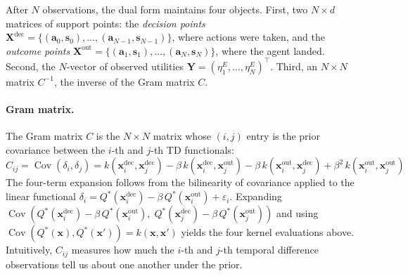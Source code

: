 After $N$ observations, the dual form maintains four objects. First, two
$N \times d$ matrices of support points: the \emph{decision points}
$\mathbf{X}^{\mathrm{dec}} = \{(\mathbf{a}_0, \mathbf{s}_0), \ldots,
(\mathbf{a}_{N-1}, \mathbf{s}_{N-1})\}$, where actions were taken, and
the \emph{outcome points}
$\mathbf{X}^{\mathrm{out}} = \{(\mathbf{a}_1, \mathbf{s}_1), \ldots,
(\mathbf{a}_N, \mathbf{s}_N)\}$, where the agent landed. Second, the
$N$-vector of observed utilities
$\mathbf{Y} = (\eta^E_1, \ldots, \eta^E_N)^\top$. Third, an $N \times N$
matrix $C^{-1}$, the inverse of the Gram matrix $C$.

\paragraph{Gram matrix.}
The Gram matrix $C$ is the $N \times N$ matrix whose $(i,j)$ entry is the
prior covariance between the $i$-th and $j$-th TD functionals:
\begin{equation}
    C_{ij} = \operatorname{Cov}(\delta_i, \delta_j)
    = k(\mathbf{x}^{\mathrm{dec}}_i, \mathbf{x}^{\mathrm{dec}}_j)
    - \beta\, k(\mathbf{x}^{\mathrm{dec}}_i, \mathbf{x}^{\mathrm{out}}_j)
    - \beta\, k(\mathbf{x}^{\mathrm{out}}_i, \mathbf{x}^{\mathrm{dec}}_j)
    + \beta^2\, k(\mathbf{x}^{\mathrm{out}}_i, \mathbf{x}^{\mathrm{out}}_j)
\end{equation}
The four-term expansion follows from the bilinearity of covariance applied to
the linear functional $\delta_i = Q^*(\mathbf{x}^{\mathrm{dec}}_i) -
\beta\, Q^*(\mathbf{x}^{\mathrm{out}}_i) + \varepsilon_i$. Expanding
$\operatorname{Cov}(Q^*(\mathbf{x}^{\mathrm{dec}}_i) - \beta\,
Q^*(\mathbf{x}^{\mathrm{out}}_i),\; Q^*(\mathbf{x}^{\mathrm{dec}}_j) -
\beta\, Q^*(\mathbf{x}^{\mathrm{out}}_j))$ and using
$\operatorname{Cov}(Q^*(\mathbf{x}), Q^*(\mathbf{x}')) = k(\mathbf{x},
\mathbf{x}')$ yields the four kernel evaluations above. Intuitively,
$C_{ij}$ measures how much the $i$-th and $j$-th temporal difference
observations tell us about one another under the prior.

